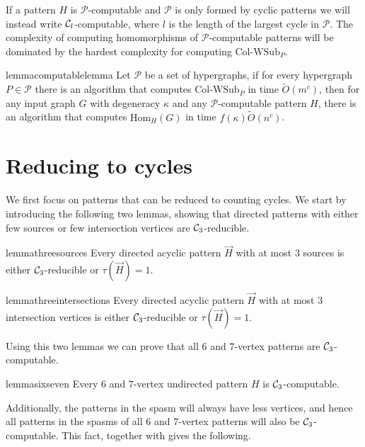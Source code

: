 \documentclass[a4paper,UKenglish,cleveref, autoref, numberwithinsect, thm-restate]{lipics-v2021}
\newcommand{\reducible}[1]{${#1}$-reducible}
\newcommand{\computable}[1]{${#1}$-computable}
\newcommand{\cycle}[1]{\cC_{#1}}
\newcommand{\WSubNI}[1]{\mathrm{\text{Col-WSub}}_{#1}}
\newcommand{\Hom}[2]{\mathrm{Hom}_{#2}(#1)}
\newcommand{\degen}{\kappa}
\newcommand{\dtw}{\tau}
\newcommand{\cC}{{\cal C}}
\begin{document}
		If a pattern $H$ is \computable{\mathcal{P}} and $\mathcal{P}$ is only formed by cyclic patterns we will instead write \computable{\cycle{l}}, where $l$ is the length of the largest cycle in $\mathcal{P}$. The complexity of computing homomorphisms of \computable{\mathcal{P}} patterns will be dominated by the hardest complexity for computing $\WSubNI{P}$.
	
	\begin{restatable}{lemma}{computablelemma} \label{lem:computable}
				Let $\mathcal{P}$ be a set of hypergraphs, if for every hypergraph $P \in \mathcal{P}$ there is an algorithm that computes $\WSubNI{P}$ in time $\tilde{O}(m^c)$, then for any input graph $G$ with degeneracy $\degen$ and any \computable{\mathcal{P}} pattern $H$, there is an algorithm that computes $\Hom{G}{H}$ in time $f(\degen)\tilde{O}(n^c)$.
		\end{restatable}


	\section{Reducing to cycles} \label{sec:reductions}
	
	We first focus on patterns that can be reduced to counting cycles. We start by introducing the following two lemmas, showing that directed patterns with either few sources or few intersection vertices are \reducible{\cycle{3}}.
	
	\begin{restatable}{lemma}{threesources} \label{lem:3sources}
		Every directed acyclic pattern $\vec{H}$ with at most $3$ sources is either \reducible{\cycle{3}} or $\dtw(\vec{H})=1$.
	\end{restatable}

	\begin{restatable}{lemma}{threeintersections} \label{lem:3intersections}
		Every directed acyclic pattern $\vec{H}$ with at most $3$ intersection vertices is either \reducible{\cycle{3}} or $\dtw(\vec{H})=1$. 
	\end{restatable}
	
	Using this two lemmas we can prove that all $6$ and $7$-vertex patterns are \computable{\cycle{3}}.
	
	\begin{restatable}{lemma}{sixseven} \label{lem:sixseven}
		Every $6$ and $7$-vertex undirected pattern $H$ is \computable{\cycle{3}}.
	\end{restatable}

	Additionally, the patterns in the spasm will always have less vertices, and hence all patterns in the spasms of all $6$ and $7$-vertex patterns will also be \computable{\cycle{3}}. This fact, together with  gives the following.
\end{document}
